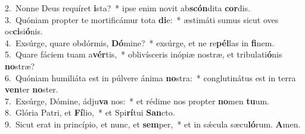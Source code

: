 {2.~}Nonne Deus requíret \textbf{i}sta?~* ipse enim novit ab\textbf{scón}dita \textbf{cor}dis.\\
{3.~}Quóniam propter te mortificámur tota \textbf{di}e:~* æstimáti sumus sicut oves oc\textbf{ci}si\textbf{ó}nis.\\
{4.~}Exsúrge, quare obdórmis, \textbf{Dó}mine?~* exsúrge, et ne re\textbf{pél}las in \textbf{fi}nem.\\
{5.~}Quare fáciem tuam a\textbf{vér}tis,~* oblivísceris inópiæ nostræ, et tribulati\textbf{ó}nis \textbf{no}stræ?\\
{6.~}Quóniam humiliáta est in púlvere ánima \textbf{no}stra:~* conglutinátus est in terra \textbf{ven}ter \textbf{no}ster.\\
{7.~}Exsúrge, Dómine, ádju\textbf{va} nos:~* et rédime nos propter \textbf{no}men \textbf{tu}um.\\
{8.~}Glória Patri, et \textbf{Fí}lio,~* et Spi\textbf{rí}tui \textbf{San}cto.\\
{9.~}Sicut erat in princípio, et nunc, et \textbf{sem}per,~* et in sǽcula sæcu\textbf{ló}rum. \textbf{A}men.\\
